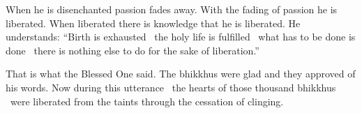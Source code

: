 When he is disenchanted passion fades away. With the fading of passion he is liberated. When liberated there is knowledge that he is liberated. He understands: “Birth is exhausted \breathmark\ the holy life is fulfilled \breathmark\ what has to be done is done \breathmark\ there is nothing else to do for the sake of liberation.”

That is what the Blessed One said. The bhikkhus were glad and they approved of his words. Now during this utterance \breathmark\ the hearts of those thousand bhikkhus \breathmark\ were liberated from the taints through the cessation of clinging.

\suttaRef{[SN 35.28]}

\bottomNav{}
